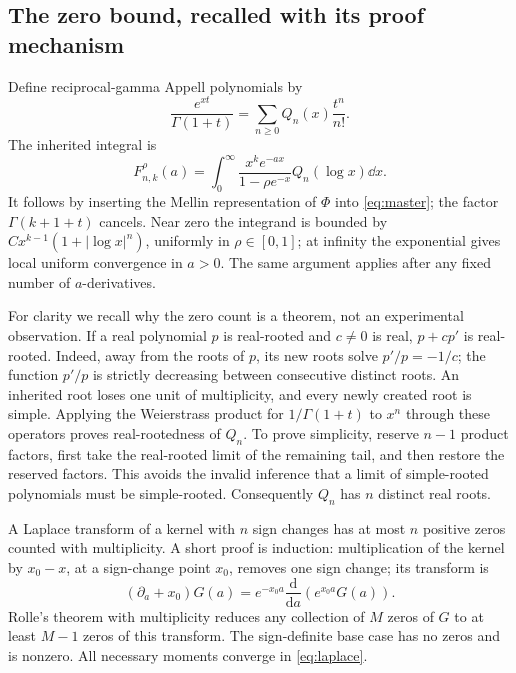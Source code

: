 \documentclass[11pt,letterpaper]{article}
\numberwithin{equation}{section}
\theoremstyle{definition}\newtheorem{definition}[theorem]{Definition}
\theoremstyle{remark}\newtheorem{remark}[theorem]{Remark}
\newcommand{\F}[3]{F_{#1,#2}^{#3}}
\begin{document}
\subsection{The zero bound, recalled with its proof mechanism}
Define reciprocal-gamma Appell polynomials by
\[
 \frac{e^{xt}}{\Gamma(1+t)}=\sum_{n\ge0}Q_n(x)\frac{t^n}{n!}.
\]
The inherited integral is
\begin{equation}\label{eq:laplace}
 \F nk\rho(a)=\int_0^\infty
 \frac{x^ke^{-ax}}{1-\rho e^{-x}}Q_n(\log x)\dd x.
\end{equation}
It follows by inserting the Mellin representation of $\Phi$ into \eqref{eq:master}; the factor $\Gamma(k+1+t)$ cancels. Near zero the integrand is bounded by $C x^{k-1}(1+|\log x|^n)$, uniformly in $\rho\in[0,1]$; at infinity the exponential gives local uniform convergence in $a>0$. The same argument applies after any fixed number of $a$-derivatives.

For clarity we recall why the zero count is a theorem, not an experimental observation. If a real polynomial $p$ is real-rooted and $c\ne0$ is real, $p+cp'$ is real-rooted. Indeed, away from the roots of $p$, its new roots solve $p'/p=-1/c$; the function $p'/p$ is strictly decreasing between consecutive distinct roots. An inherited root loses one unit of multiplicity, and every newly created root is simple. Applying the Weierstrass product for $1/\Gamma(1+t)$ \cite{gamma} to $x^n$ through these operators proves real-rootedness of $Q_n$. To prove simplicity, reserve $n-1$ product factors, first take the real-rooted limit of the remaining tail, and then restore the reserved factors. This avoids the invalid inference that a limit of simple-rooted polynomials must be simple-rooted. Consequently $Q_n$ has $n$ distinct real roots.

A Laplace transform of a kernel with $n$ sign changes has at most $n$ positive zeros counted with multiplicity. A short proof is induction: multiplication of the kernel by $x_0-x$, at a sign-change point $x_0$, removes one sign change; its transform is
\[
 (\partial_a+x_0)G(a)=e^{-x_0a}\frac{\mathrm d}{\mathrm da}(e^{x_0a}G(a)).
\]
Rolle's theorem with multiplicity reduces any collection of $M$ zeros of $G$ to at least $M-1$ zeros of this transform. The sign-definite base case has no zeros and is nonzero. All necessary moments converge in \eqref{eq:laplace}.
\end{document}
